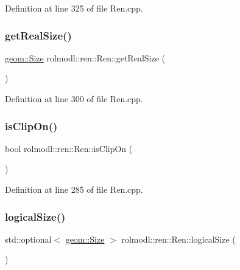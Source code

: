 Definition at line 325 of file Ren.\+cpp.

\mbox{\label{classrolmodl_1_1blend_mode_1_1_ren_aa9471357aaa9b96dabf0050d0335440d}} 
\subsubsection{\texorpdfstring{getRealSize()}{getRealSize()}}
{\footnotesize\ttfamily \mbox{\hyperlink{structrolmodl_1_1geom_1_1_size}{geom\+::\+Size}} rolmodl\+::ren\+::\+Ren\+::get\+Real\+Size (\begin{DoxyParamCaption}{ }\end{DoxyParamCaption})}



Definition at line 300 of file Ren.\+cpp.

\mbox{\label{classrolmodl_1_1blend_mode_1_1_ren_acdf86b2e5b41aa0501a7ece44ceeed40}} 
\subsubsection{\texorpdfstring{isClipOn()}{isClipOn()}}
{\footnotesize\ttfamily bool rolmodl\+::ren\+::\+Ren\+::is\+Clip\+On (\begin{DoxyParamCaption}{ }\end{DoxyParamCaption})\hspace{0.3cm}{\ttfamily [noexcept]}}



Definition at line 285 of file Ren.\+cpp.

\mbox{\label{classrolmodl_1_1blend_mode_1_1_ren_a90dbb7a6955076decc470c734fb25ab8}} 
\subsubsection{\texorpdfstring{logicalSize()}{logicalSize()}}
{\footnotesize\ttfamily std\+::optional$<$ \mbox{\hyperlink{structrolmodl_1_1geom_1_1_size}{geom\+::\+Size}} $>$ rolmodl\+::ren\+::\+Ren\+::logical\+Size (\begin{DoxyParamCaption}{ }\end{DoxyParamCaption})\hspace{0.3cm}{\ttfamily [noexcept]}}



